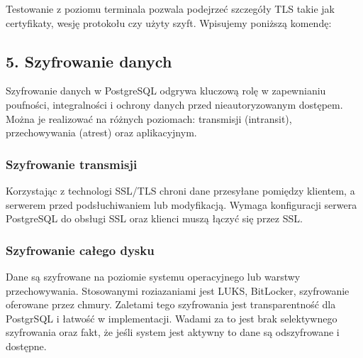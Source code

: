 \documentclass[letterpaper,10pt,polish]{sphinxmanual}
\begin{document}
\begin{sphinxVerbatim}[commandchars=\\\{\}]
      
 
     
  
\end{sphinxVerbatim}

\sphinxAtStartPar
Testowanie z poziomu terminala pozwala podejrzeć szczegóły TLS takie jak certyfikaty, wesję protokołu czy użyty szyft. Wpisujemy poniższą komendę:

\begin{sphinxVerbatim}[commandchars=\\\{\}]
      
\end{sphinxVerbatim}


\subsection{5. Szyfrowanie danych}
\label{\detokenize{rozdzial2/bezpieczenstwo/index:szyfrowanie-danych}}
\sphinxAtStartPar
Szyfrowanie danych w PostgreSQL odgrywa kluczową rolę w zapewnianiu poufności, integralności i ochrony danych przed nieautoryzowanym dostępem. Można je realizować na różnych poziomach: transmisji (in\sphinxhyphen{}transit), przechowywania (at\sphinxhyphen{}rest) oraz aplikacyjnym.


\subsubsection{Szyfrowanie transmisji}
\label{\detokenize{rozdzial2/bezpieczenstwo/index:szyfrowanie-transmisji}}
\sphinxAtStartPar
Korzystając z technologi SSL/TLS chroni dane przesyłane pomiędzy klientem, a serwerem przed podsłuchiwaniem lub modyfikacją. Wymaga konfiguracji serwera PostgreSQL do obsługi SSL oraz klienci muszą łączyć się przez SSL.


\subsubsection{Szyfrowanie całego dysku}
\label{\detokenize{rozdzial2/bezpieczenstwo/index:szyfrowanie-calego-dysku}}
\sphinxAtStartPar
Dane są szyfrowane na poziomie systemu operacyjnego lub warstwy przechowywania. Stosowanymi roziazaniami jest LUKS, BitLocker, szyfrowanie oferowane przez chmury. Zaletami tego szyfrowania jest transparentność dla PostgrSQL i łatwość w implementacji. Wadami za to jest brak selektywnego szyfrowania oraz fakt, że jeśli system jest aktywny to dane są odszyfrowane i dostępne.
\end{document}
